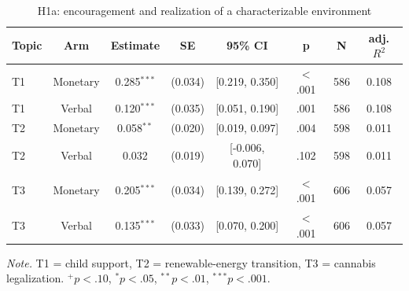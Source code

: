 \begin{table}[htbp]
\centering
\begin{threeparttable}
\caption{H1a: encouragement and realization of a characterizable environment}
\label{tab:tab_h1a_realization}
\begin{tabular}{lccccccc}
\toprule
  Topic & Arm & Estimate & SE & 95\% CI & p & N & adj. $R^2$ \\
\midrule
  T1 & Monetary & 0.285$^{***}$ & (0.034) & [0.219, 0.350] & $<$.001 & 586 & 0.108 \\
  T1 & Verbal & 0.120$^{***}$ & (0.035) & [0.051, 0.190] & .001 & 586 & 0.108 \\
  T2 & Monetary & 0.058$^{**}$ & (0.020) & [0.019, 0.097] & .004 & 598 & 0.011 \\
  T2 & Verbal & 0.032 & (0.019) & [-0.006, 0.070] & .102 & 598 & 0.011 \\
  T3 & Monetary & 0.205$^{***}$ & (0.034) & [0.139, 0.272] & $<$.001 & 606 & 0.057 \\
  T3 & Verbal & 0.135$^{***}$ & (0.033) & [0.070, 0.200] & $<$.001 & 606 & 0.057 \\
\bottomrule
\end{tabular}
\begin{tablenotes}\footnotesize\item \textit{Note.} T1 = child support, T2 = renewable-energy transition, T3 = cannabis legalization. $^{+}p<.10$, $^{*}p<.05$, $^{**}p<.01$, $^{***}p<.001$.\end{tablenotes}
\end{threeparttable}
\end{table}
